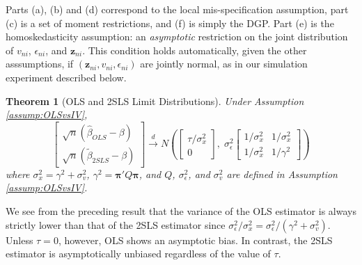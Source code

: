 \documentclass[12pt]{article}
\newtheorem{thm}{Theorem}[section]
\theoremstyle{definition}
\begin{document}
Parts (a), (b) and (d) correspond to the local mis-specification assumption, part (c) is a set of moment restrictions, and (f) is simply the DGP.
Part (e) is the homoskedasticity assumption: an \emph{asymptotic} restriction on the joint distribution of $v_{ni}$, $\epsilon_{ni}$, and $\mathbf{z}_{ni}$. 
This condition holds automatically, given the other asssumptions, if $(\mathbf{z}_{ni}, v_{ni}, \epsilon_{ni})$ are jointly normal, as in our simulation experiment described below. 

\begin{thm}[OLS and 2SLS Limit Distributions]
	\label{thm:OLSvsIV} Under Assumption \ref{assump:OLSvsIV},
	$$
\left[
\begin{array}{c}
  \sqrt{n}(\widehat{\beta}_{OLS} - \beta) \\
  \sqrt{n}(\widetilde{\beta}_{2SLS} - \beta)
\end{array}
\right] \overset{d}{\rightarrow}
N\left(
\left[
\begin{array}{c}
\tau/\sigma_x^2 \\ 
0
\end{array}
\right],\;
\sigma_\epsilon^2 \left[ \begin{array}{cc}
  1/\sigma_x^2 & 1/\sigma_x^2\\
  1/\sigma_x^2 & 1/\gamma^2 
  \end{array}\right]
  \right)
$$
where $\sigma_x^2 = \gamma^2 + \sigma_v^2$, $\gamma^2 = \boldsymbol{\pi}'Q \boldsymbol{\pi}$, and $Q$, $ \sigma_\epsilon^2$, and $\sigma_v^2$ are defined in Assumption \ref{assump:OLSvsIV}.
\end{thm}

We see from the preceding result that the variance of the OLS estimator is always strictly lower than that of the 2SLS estimator since $\sigma^2_\epsilon/\sigma_x^2 = \sigma^2_\epsilon/(\gamma^2 + \sigma_v^2)$. 
Unless $\tau = 0$, however, OLS shows an asymptotic bias. 
In contrast, the 2SLS estimator is asymptotically unbiased regardless of the value of $\tau$.  
\end{document}
